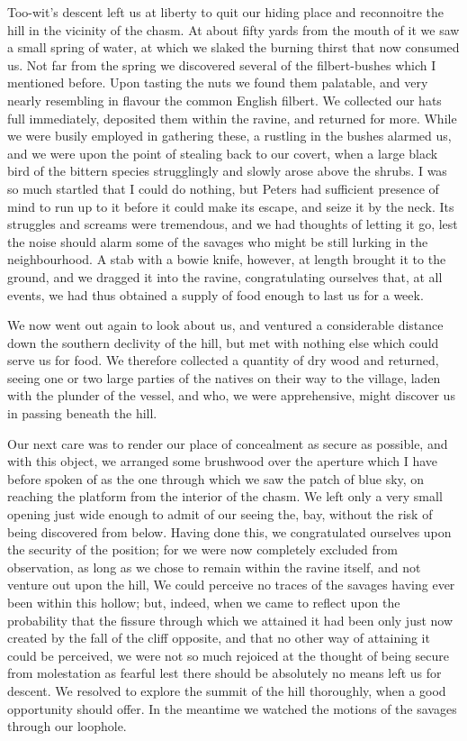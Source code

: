 Too-wit's descent left us at liberty to quit our hiding place and reconnoitre
the hill in the vicinity of the chasm. At about fifty yards from the mouth of it
we saw a small spring of water, at which we slaked the burning thirst that now
consumed us. Not far from the spring we discovered several of the filbert-bushes
which I mentioned before. Upon tasting the nuts we found them palatable, and
very nearly resembling in flavour the common English filbert. We collected our
hats full immediately, deposited them within the ravine, and returned for more.
While we were busily employed in gathering these, a rustling in the bushes
alarmed us, and we were upon the point of stealing back to our covert, when a
large black bird of the bittern species strugglingly and slowly arose above the
shrubs. I was so much startled that I could do nothing, but Peters had
sufficient presence of mind to run up to it before it could make its escape, and
seize it by the neck. Its struggles and screams were tremendous, and we had
thoughts of letting it go, lest the noise should alarm some of the savages who
might be still lurking in the neighbourhood. A stab with a bowie knife, however,
at length brought it to the ground, and we dragged it into the ravine,
congratulating ourselves that, at all events, we had thus obtained a supply of
food enough to last us for a week. 

We now went out again to look about us, and ventured a considerable distance
down the southern declivity of the hill, but met with nothing else which could
serve us for food. We therefore collected a quantity of dry wood and returned,
seeing one or two large parties of the natives on their way to the village,
laden with the plunder of the vessel, and who, we were apprehensive, might
discover us in passing beneath the hill. 

Our next care was to render our place of concealment as secure as possible,
and with this object, we arranged some brushwood over the aperture which I have
before spoken of as the one through which we saw the patch of blue sky, on
reaching the platform from the interior of the chasm. We left only a very small
opening just wide enough to admit of our seeing the, bay, without the risk of
being discovered from below. Having done this, we congratulated ourselves upon
the security of the position; for we were now completely excluded from
observation, as long as we chose to remain within the ravine itself, and not
venture out upon the hill, We could perceive no traces of the savages having
ever been within this hollow; but, indeed, when we came to reflect upon the
probability that the fissure through which we attained it had been only just now
created by the fall of the cliff opposite, and that no other way of attaining it
could be perceived, we were not so much rejoiced at the thought of being secure
from molestation as fearful lest there should be absolutely no means left us for
descent. We resolved to explore the summit of the hill thoroughly, when a good
opportunity should offer. In the meantime we watched the motions of the savages
through our loophole. 

